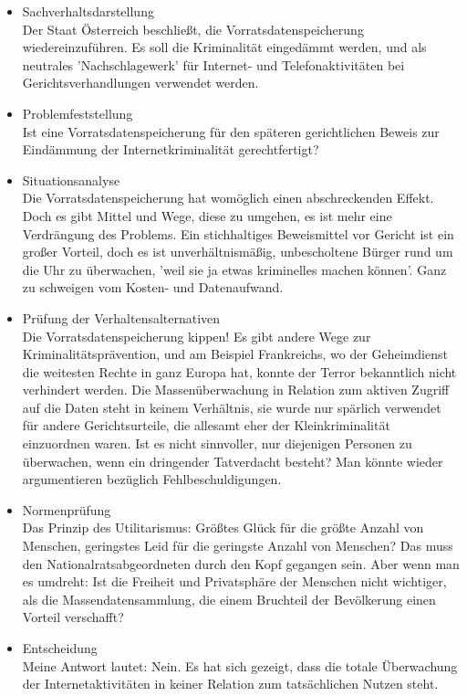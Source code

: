 \documentclass[letterpaper, 12pt]{article}
\begin{document}
\begin{itemize}
	\item Sachverhaltsdarstellung \\
	Der Staat Österreich beschließt, die Vorratsdatenspeicherung wiedereinzuführen. Es soll die Kriminalität eingedämmt werden, und als neutrales 'Nachschlagewerk' für Internet- und Telefonaktivitäten bei Gerichtsverhandlungen verwendet werden.
	\item Problemfeststellung \\
	Ist eine Vorratsdatenspeicherung für den späteren gerichtlichen Beweis zur Eindämmung der
Internetkriminalität gerechtfertigt?
	\item Situationsanalyse \\
	Die Vorratsdatenspeicherung hat womöglich einen abschreckenden Effekt. Doch es gibt Mittel und Wege, diese zu umgehen, es ist mehr eine Verdrängung des Problems. Ein stichhaltiges Beweismittel vor Gericht ist ein großer Vorteil, doch es ist unverhältnismäßig, unbescholtene Bürger rund um die Uhr zu überwachen, 'weil sie ja etwas kriminelles machen können'. Ganz zu schweigen vom Kosten- und Datenaufwand. \clearpage
	\item Prüfung der Verhaltensalternativen \\
	Die Vorratsdatenspeicherung kippen! Es gibt andere Wege zur Kriminalitätsprävention, und am Beispiel Frankreichs, wo der Geheimdienst die weitesten Rechte in ganz Europa hat, konnte der Terror bekanntlich nicht verhindert werden. Die Massenüberwachung in Relation zum aktiven Zugriff auf die Daten steht in keinem Verhältnis, sie wurde nur spärlich verwendet für andere Gerichtsurteile, die allesamt eher der Kleinkriminalität einzuordnen waren. Ist es nicht sinnvoller, nur diejenigen Personen zu überwachen, wenn ein dringender Tatverdacht besteht? Man könnte wieder argumentieren bezüglich Fehlbeschuldigungen.
	\item Normenprüfung \\
	Das Prinzip des Utilitarismus: Größtes Glück für die größte Anzahl von Menschen, 
geringstes Leid für die geringste Anzahl von Menschen? Das muss den Nationalratsabgeordneten durch den Kopf gegangen sein. Aber wenn man es umdreht: Ist die Freiheit und Privatsphäre der Menschen nicht wichtiger, als die Massendatensammlung, die einem Bruchteil der Bevölkerung einen Vorteil verschafft?
	\item Entscheidung \\
	Meine Antwort lautet: Nein. Es hat sich gezeigt, dass die totale Überwachung der Internetaktivitäten in keiner Relation zum tatsächlichen Nutzen steht. 
\end{itemize}
\end{document}
